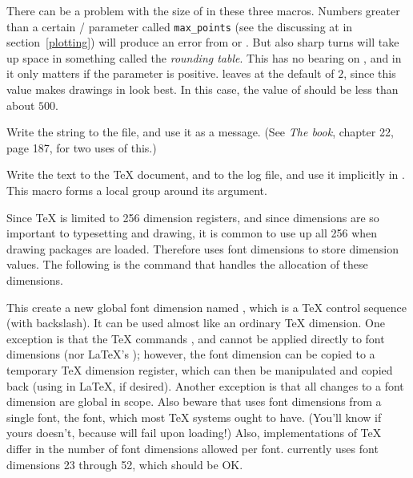 \documentclass[letterpaper]{article}
\begin{document}
There can be a problem with the size of  in these three
macros. Numbers greater than a certain \MF/\MP{} parameter called
\verb$max_points$ (see the discussing at  in
section~\ref{plotting}) will produce an error from \MF{} or \MP{}. But
also sharp turns will take up space in something called the
\emph{rounding table}. This has no bearing on \MP{}, and in \MF{} it
only matters if the parameter  is positive. \Mfp{}
leaves  at the default of $2$, since this value makes
drawings in \MF{} look best. In this case, the value of 
should be less than about $500$.

\begin{cd}
%
\end{cd}

Write the string  to the \MF{} file, and use it as a \MF{}
message. (See \textit{The \MF{}book}, chapter 22, page 187, for two uses of
this.)

\begin{cd}
%
\end{cd}

Write the text  to the \TeX{} document, and to the log file,
and use it implicitly in . This macro forms a local group
around its argument.

\medskip

Since \TeX{} is limited to 256 dimension registers, and since dimensions
are so important to typesetting and drawing, it is common to use up all
256 when drawing packages are loaded. Therefore \mfp{} uses font
dimensions to store dimension values. The following is the command that
handles the allocation of these dimensions.

\begin{cd}
%
\end{cd}

This create a new global font dimension named , which is a
\TeX{} control sequence (with backslash). It can be used almost like
an ordinary \TeX{} dimension.  One exception is that the \TeX{} commands
,  and  cannot be applied directly
to font dimensions (nor \LaTeX{}'s ); however, the font
dimension can be copied to a temporary \TeX{} dimension register, which
can then be manipulated and copied back (using  in \LaTeX{},
if desired). Another exception is that all changes to a font dimension
are global in scope. Also beware that  uses font dimensions
from a single font, the  font, which most \TeX{} systems
ought to have. (You'll know if yours doesn't, because \mfp{} will fail
upon loading!) Also, implementations of \TeX{} differ in the number of
font dimensions allowed per font. \Mfp{} currently uses font dimensions
23 through 52, which should be OK.
\end{document}
